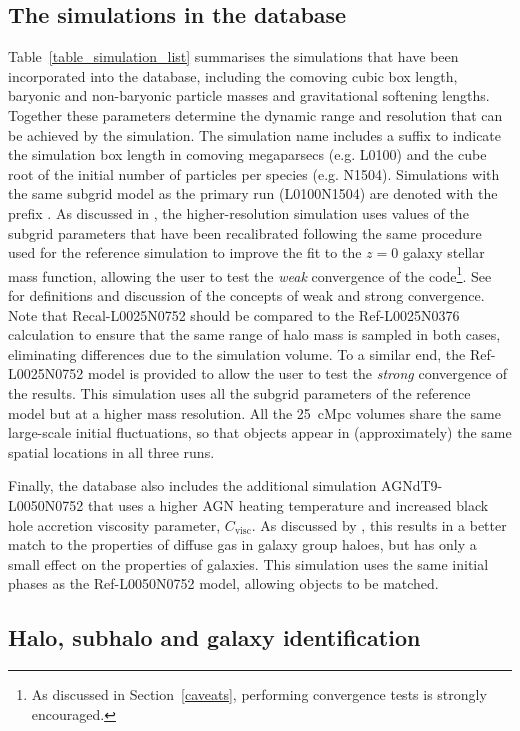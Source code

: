 \subsection{The simulations in the database}
Table~\ref{table_simulation_list} summarises the simulations that have been
incorporated into the database, including the comoving cubic box length,
baryonic and non-baryonic particle masses and gravitational softening
lengths. Together these parameters determine the dynamic range and resolution
that can be achieved by the simulation. The simulation name includes a suffix to
indicate the simulation box length in comoving megaparsecs (e.g. L0100) and the
cube root of the initial number of particles per species
(e.g. N1504). Simulations with the same subgrid model as the primary run
(L0100N1504) are denoted with the prefix . As discussed in
\citet{Schaye2015}, the  higher-resolution simulation uses
values of the subgrid parameters that have been recalibrated following the same
procedure used for the reference simulation to improve the fit to the $z=0$
galaxy stellar mass function, allowing the user to test the \emph{weak}
convergence of the code\footnote{As discussed in Section~\ref{caveats},
  performing convergence tests is strongly encouraged.}. See \cite{Schaye2015}
for definitions and discussion of the concepts of weak and strong
convergence. Note that Recal-L0025N0752 should be compared to the Ref-L0025N0376
calculation to ensure that the same range of halo mass is sampled in both cases,
eliminating differences due to the simulation volume. To a similar end, the
Ref-L0025N0752 model is provided to allow the user to test the \emph{strong}
convergence of the results. This simulation uses all the subgrid parameters of
the reference model but at a higher mass resolution. All the 25~cMpc volumes
share the same large-scale initial fluctuations, so that objects appear in
(approximately) the same spatial locations in all three runs.

Finally, the database also includes the additional simulation AGNdT9-L0050N0752
that uses a higher AGN heating temperature and increased black hole accretion
viscosity parameter, $C_{\text{visc}}$. As discussed by \cite{Schaye2015}, this
results in a better match to the properties of diffuse gas in galaxy group
haloes, but has only a small effect on the properties of galaxies. This
simulation uses the same initial phases as the Ref-L0050N0752 model, allowing
objects to be matched.

\subsection{Halo, subhalo and galaxy identification}

